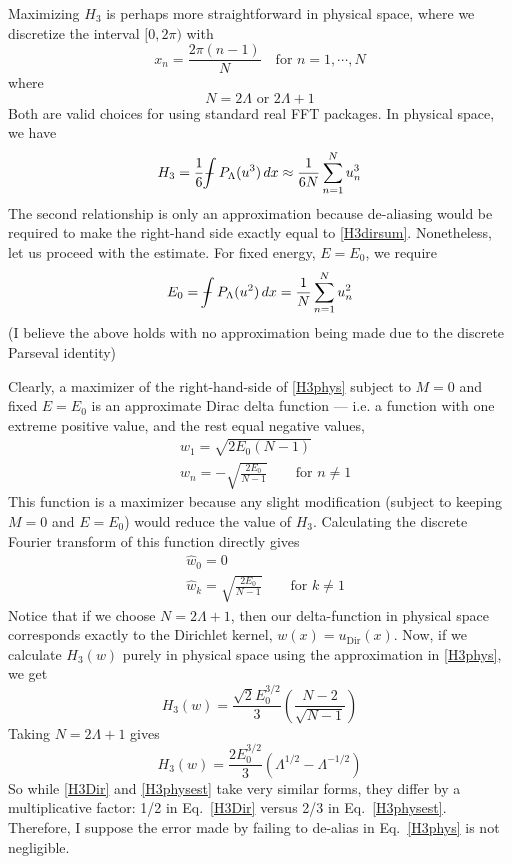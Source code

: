 \documentclass[12pt]{article}
\newcommand{\Proj}{P_{\Lambda}}
\newcommand{\sumn}{\sum_{n=1}^{N}}
\newcommand{\uDir}{u_{\text{Dir}}}
\def\Xint#1{\mathchoice
   {\XXint\displaystyle\textstyle{#1}}%
   {\XXint\textstyle\scriptstyle{#1}}%
   {\XXint\scriptstyle\scriptscriptstyle{#1}}%
   {\XXint\scriptscriptstyle\scriptscriptstyle{#1}}%
   \!\int}
\def\XXint#1#2#3{{\setbox0=\hbox{$#1{#2#3}{\int}$}
     \vcenter{\hbox{$#2#3$}}\kern-.5\wd0}}
\def\dashint{\Xint-}
\newcommand{\intt}{\dashint}%
\newcommand{\dx}{\, dx}
\begin{document}
Maximizing $H_3$ is perhaps more straightforward in physical space, where we discretize the interval $[0, 2 \pi)$ with 
\begin{equation}
x_n = \frac{2 \pi (n-1)}{N} \quad \text{for } n=1,\cdots,N
\end{equation}
where
\begin{equation}
N = 2 \Lambda \text{ or  } 2 \Lambda +1
\end{equation}
Both are valid choices for using standard real FFT packages.
In physical space, we have
\begin{equation}
\label{H3phys}
H_3 = \frac{1}{6} \intt \Proj (u^3) \dx \approx \frac{1}{6N} \sumn u_n^3
\end{equation}
The second relationship is only an approximation because de-aliasing would be required to make the right-hand side exactly equal to \eqref{H3dirsum}. Nonetheless, let us proceed with the estimate. For fixed energy, $E=E_0$, we require
\begin{equation}
E_0 = \intt \Proj(u^2) \dx = \frac{1}{N} \sumn u_n^2
\end{equation}
(I believe the above holds with no approximation being made due to the discrete Parseval identity) 

Clearly, a maximizer of the right-hand-side of \eqref{H3phys} subject to $M=0$ and fixed $E=E_0$ is an approximate Dirac delta function --- i.e. a function with one extreme positive value, and the rest equal negative values,
\begin{align}
& w_1 = \sqrt{2 E_0 (N-1)}		\\
& w_n = -\sqrt{\frac{2 E_0}{N-1}}	\qquad \text{for } n \ne 1
\end{align}
This function is a maximizer because any slight modification (subject to keeping $M=0$ and $E=E_0$) would reduce the value of $H_3$.
Calculating the discrete Fourier transform of this function directly gives
\begin{align}
& \hat{w}_0 = 0	\\
& \hat{w}_k = \sqrt{\frac{2 E_0}{N-1}} \qquad \text{for } k \ne 1
\end{align}
Notice that if we choose $N = 2\Lambda + 1$, then our delta-function in physical space corresponds exactly to the Dirichlet kernel, $w(x) = \uDir(x)$. Now, if we calculate $H_3(w)$ purely in physical space using the approximation in \eqref{H3phys}, we get
\begin{equation}
H_3(w) = \frac{\sqrt{2} E_0^{3/2}}{3} \left( \frac{N-2}{\sqrt{N-1}} \right)
\end{equation}
Taking $N = 2\Lambda + 1$ gives
\begin{equation}
\label{H3physest}
H_3(w) = \frac{2 E_0^{3/2}}{3} \left( \Lambda^{1/2} - \Lambda^{-1/2} \right)
\end{equation}
So while \eqref{H3Dir} and \eqref{H3physest} take very similar forms, they differ by a multiplicative factor: 1/2 in Eq.~\eqref{H3Dir} versus 2/3 in Eq.~\eqref{H3physest}. Therefore, I suppose the error made by failing to de-alias in Eq.~\eqref{H3phys} is not negligible.
\end{document}
